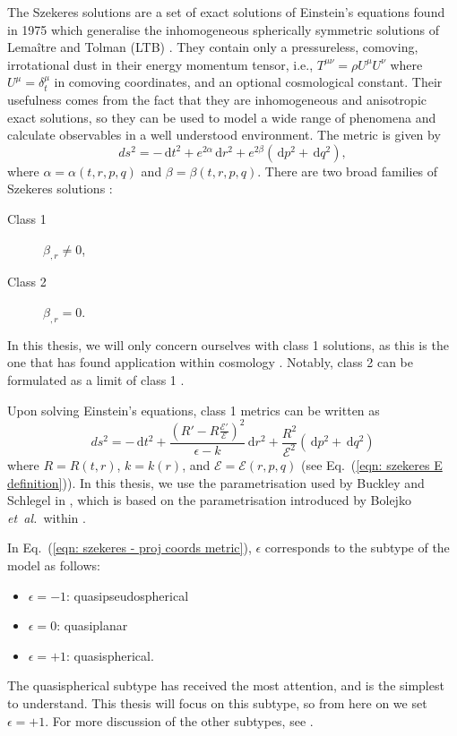 \documentclass[a4paper,12pt]{report}
\newcommand{\diff}[1]{\,\text{d}{#1}}
\newcommand{\etal}{\emph{et~al.\ }}
\renewcommand{\eqref}[1]{Eq.~({#1})}
\begin{document}
The Szekeres solutions are a set of exact solutions of Einstein's equations found in 1975 \cite{RN20,RN19} which generalise the inhomogeneous spherically symmetric solutions of Lema\^itre and Tolman (LTB) \cite{RN65,RN62,RN135,RN136}. They contain only a pressureless, comoving, irrotational dust in their energy momentum tensor, i.e., $T^{\mu\nu} = \rho U^\mu U^\nu$ where $U^\mu = \delta^{\mu}_t$ in comoving coordinates, and an optional cosmological constant. Their usefulness comes from the fact that they are inhomogeneous and anisotropic exact solutions, so they can be used to model a wide range of phenomena and calculate observables in a well understood environment. The metric is given by
\begin{equation}
  ds^2 = -\diff{t}^2 + e^{2\alpha}\diff{r}^2 + e^{2\beta}(\diff{p}^2 + \diff{q}^2),
\end{equation}
where $\alpha = \alpha(t,r,p,q)$ and $\beta = \beta(t,r,p,q)$. There are two broad families of Szekeres solutions \cite{RN5}:
\begin{description}
  \item[Class 1] $\beta_{,r} \neq 0$,
  \item[Class 2] $\beta_{,r} = 0$.
\end{description}
In this thesis, we will only concern ourselves with class 1 solutions, as this is the one that has found application within cosmology \cite{RN4}. Notably, class 2 can be formulated as a limit of class 1 \cite{RN132}.

Upon solving Einstein's equations, class 1 metrics can be written as
\begin{equation}\label{eqn: szekeres - proj coords metric}
  ds^2 = -\diff{t}^2 + \frac{(R'-R\frac{\mathcal{E}'}{\mathcal{E}})^2}{\epsilon - k}\diff{r}^2 + \frac{R^2}{\mathcal{E}^2}(\diff{p}^2 + \diff{q}^2)
\end{equation}
where $R=R(t,r)$, $k=k(r)$, and $\mathcal{E}=\mathcal{E}(r,p,q)$ (see \eqref{\ref{eqn: szekeres E definition}}). In this thesis, we use the parametrisation used by Buckley and Schlegel in \cite{RN1}, which is based on the parametrisation introduced by Bolejko \etal within \cite{RN4}.

In \eqref{\ref{eqn: szekeres - proj coords metric}}, $\epsilon$ corresponds to the subtype of the model as follows:
\begin{itemize}
  \item $\epsilon = -1$: quasipseudospherical
  \item $\epsilon = 0$: quasiplanar
  \item $\epsilon = +1$: quasispherical.
\end{itemize}
The quasispherical subtype has received the most attention, and is the simplest to understand. This thesis will focus on this subtype, so from here on we set $\epsilon = +1$. For more discussion of the other subtypes, see \cite{RN5,RN134,RN133,RN4}.
\end{document}
